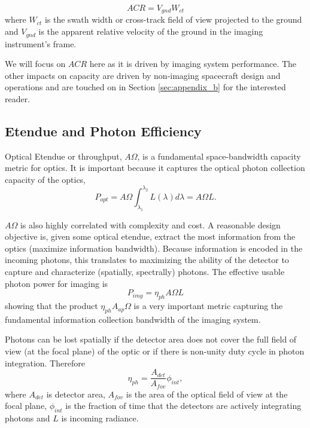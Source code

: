 \documentclass[]{spieman}  %
\begin{document}
\begin{equation}
	\label{eq:acr_def}
    ACR = V_{gnd}W_{ct}
\end{equation}
where $W_{ct}$ is the swath width or cross-track field of view projected to the ground and $V_{gnd}$ is the apparent relative velocity of the ground in the imaging instrument's frame.

We will focus on $ACR$ here as it is driven by imaging system performance.  The other impacts on capacity are driven by non-imaging spacecraft design and operations and are touched on in Section \ref{sec:appendix_b} for the interested reader.

\subsection{Etendue and Photon Efficiency}
\label{sec:entendue}

Optical Etendue or throughput, $A \Omega$, is a fundamental space-bandwidth capacity metric for optics.  It is important because it captures the optical photon collection capacity of the optics,
\begin{equation}
    P_{opt} = A\Omega \int_{\lambda_1}^{\lambda_2}L(\lambda) d\lambda = A\Omega L.
\end{equation}

$A\Omega$ is also highly correlated with complexity and cost.  A reasonable design objective is, given some optical etendue, extract the most information from the optics (maximize information bandwidth).  Because information is encoded in the incoming photons, this translates to maximizing the ability of the detector to capture and characterize (spatially, spectrally) photons.  The effective usable photon power for imaging is
\begin{equation}
    P_{img} = \eta_{ph} A \Omega L
\end{equation}
showing that the product $\eta_{ph}A_{ap}\Omega$ is a very important metric capturing the fundamental information collection bandwidth of the imaging system.

Photons can be lost spatially if the detector area does not cover the full field of view (at the focal plane) of the optic or if there is non-unity duty cycle in photon integration.  Therefore
\begin{equation}
    \eta_{ph} = \frac{A_{det}}{A_{fov}} \phi_{int},
\end{equation}
where $A_{det}$ is detector area, $A_{fov}$ is the area of the optical field of view at the focal plane, $\phi_{int}$ is the fraction of time that the detectors are actively integrating photons and $L$ is incoming radiance.
\end{document}
